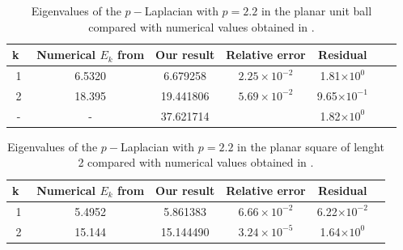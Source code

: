 \documentclass[11pt]{amsart}
\theoremstyle{definition}
\theoremstyle{remark}
\theoremstyle{plain}
\begin{document}
\begin{table}[H]
\begin{small}
\centering
\begin{tabular}{c| c|c|c|c|c|c}
k \,& Numerical $E_{k}$ from \cite{HJ11} & Our result & Relative error  &  Residual \\
\hline
1  & 6.5320    & 6.679258 & $2.25\times 10^{-2}$& 1.81$\times 10^0$ \\
2  & 18.395    & 19.441806 & $5.69\times 10^{-2}$&9.65$\times 10^{-1}$\\
-  & -    & 37.621714 & & 1.82$\times 10^0$
\end{tabular}
\caption{Eigenvalues of the $p-$Laplacian with $p=2.2$ in the planar unit ball  compared with numerical values obtained in \cite{HJ11}.}
\label{table.5}

\end{small}
\end{table}


%
%
%
%

\begin{table}[H]
\begin{small}
\centering
\begin{tabular}{c|c|c|c|c|c}
k \,& Numerical $E_{k}$ from \cite[Table 2]{HJ11} & Our result & Relative error  &  Residual \\
\hline
1  & 5.4952    & 5.861383 & $6.66\times 10^{-2}$& 6.22$\times 10^{-2}$ \\
2  & 15.144    & 15.144490 & $3.24\times 10^{-5} $&1.64$\times 10^{0}$\\
\end{tabular}
\caption{Eigenvalues of the $p-$Laplacian with $p=2.2$ in the planar square of lenght 2 compared with numerical values obtained in \cite{HJ11}.}
\label{table.6}

\end{small}
\end{table}
\end{document}

